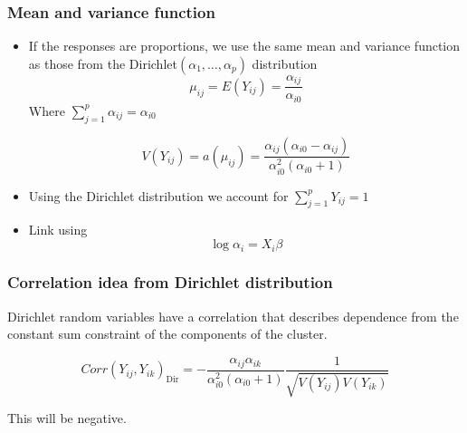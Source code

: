 \documentclass{beamer}
\begin{document}
\begin{frame}
\frametitle{Mean and variance function }
\begin{itemize}
  \item If the responses are proportions, we use the same mean and variance function as those from the Dirichlet$(\alpha_1, \ldots, \alpha_p)$ distribution
   $$\mu_{ij} = E(Y_{ij}) = \frac{\alpha_{ij}}{\alpha_{i0}}$$
  Where $\sum_{j=1}^p \alpha_{ij} = \alpha_{i0}$

  $$V(Y_{ij}) = a(\mu_{ij}) = \frac{\alpha_{ij}(\alpha_{i0} - \alpha_{ij})}{\alpha_{i0}^2(\alpha_{i0}+1)}$$
  \item Using the Dirichlet distribution we account for $\sum_{j=1}^p Y_{ij}= 1$
  \item Link using
  $$\log \alpha_{i} = X_i\beta$$


\end{itemize}
\end{frame}
\begin{frame}
\frametitle{Correlation idea from Dirichlet distribution}

Dirichlet random variables have a correlation that describes dependence from the constant sum constraint of the components of the cluster.

$$Corr(Y_{ij},Y_{ik})_{\text{Dir}} = - \frac{\alpha_{ij}\alpha_{ik}}{\alpha_{i0}^2(\alpha_{i0} + 1)}\frac{1}{\sqrt{V(Y_{ij})V(Y_{ik})}}$$

This will be negative.

\end{frame}
\end{document}
